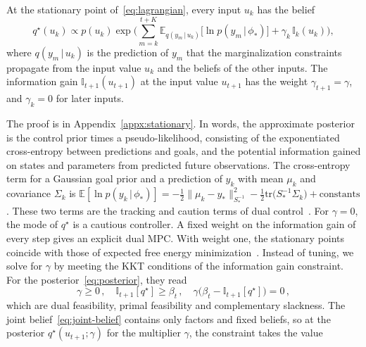 \documentclass{l4dc2027}
\def\tm{\! - \!}
\def\tr{\text{tr}}
\newcommand\given[1][]{\,#1\vert\,}
\newcommand{\E}{\mathbb{E}}
\begin{document}
\begin{theorem}\label{thm:posterior}
At the stationary point of~\eqref{eq:lagrangian}, every input $u_k$ has the belief
\begin{equation}\label{eq:posterior}
	q^\star(u_k) \propto p(u_k) \exp\Big( \sum_{m=k}^{t+K} \E_{q(y_m \given u_k)}\big[\ln p(y_m \given \phi_*)\big] + \gamma_k\, \mathbb{I}_k(u_k) \Big) ,
\end{equation}
where $q(y_m \given u_k)$ is the prediction of $y_m$ that the marginalization constraints propagate from the input value $u_k$ and the beliefs of the other inputs. The information gain $\mathbb{I}_{t+1}(u_{t+1})$ at the input value $u_{t+1}$ has the weight $\gamma_{t+1} = \gamma$, and $\gamma_k = 0$ for later inputs.
\end{theorem}
The proof is in Appendix~\ref{appx:stationary}.
In words, the approximate posterior is the control prior times a pseudo-likelihood, consisting of the exponentiated cross-entropy between predictions and goals, and the potential information gained on states and parameters from predicted future observations. The cross-entropy term for a Gaussian goal prior and a prediction of $y_k$ with mean $\mu_k$ and covariance $\Sigma_k$ is $\E[\ln p(y_k \given \phi_*)] = -\tfrac{1}{2}\|\mu_k \tm y_*\|^2_{S_*^{-1}} - \tfrac{1}{2}\tr\big(S_*^{-1}\Sigma_k\big) + \mathrm{constants}$. These two terms are the tracking and caution terms of dual control~\citep{barshalom1974dual}. 
%
For $\gamma = 0$, the mode of $q^\star$ is a cautious controller. A fixed weight on the information gain of every step gives an explicit dual MPC. With weight one, the stationary points coincide with those of expected free energy minimization~\citep{kouw2026expected}. Instead of tuning, we solve for $\gamma$ by meeting the KKT conditions of the information gain constraint. For the posterior~\eqref{eq:posterior}, they read
\begin{equation}\label{eq:kkt}
	\gamma \geq 0 \, , \quad \mathbb{I}_{t+1}[q^\star] \geq \beta_t \, , \quad \gamma \big(\beta_t - \mathbb{I}_{t+1}[q^\star]\big) = 0 \, ,
\end{equation}
which are dual feasibility, primal feasibility and complementary slackness. The joint belief~\eqref{eq:joint-belief} contains only factors and fixed beliefs, so at the posterior $q^\star(u_{t+1}; \gamma)$ for the multiplier $\gamma$, the constraint takes the value
\end{document}
